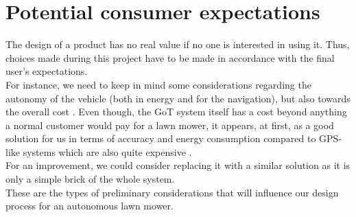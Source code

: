 \section{Potential consumer expectations}
The design of a product has no real value if no one is interested in using it. Thus, choices made during this project have to be made in accordance with the final user's expectations.\\

\noindent
For instance, we need to keep in mind some considerations regarding the autonomy of the vehicle (both in energy and for the navigation), but also towards the overall cost . Even though, the GoT system itself has a cost beyond anything a normal customer would pay for a lawn mower, it appears, at first, as a good solution for us in terms of accuracy and energy consumption compared to GPS-like systems which are also quite expensive . \\

\noindent
For an improvement, we could consider replacing it with a similar solution as it is only a simple brick of the whole system. \\

\noindent
These are the types of preliminary considerations that will influence our design process for an autonomous lawn mower.